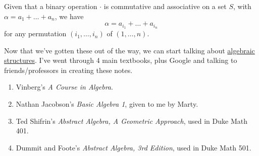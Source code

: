\begin{theorem}
  \label{thm:generalized-commutativity}
  Given that a binary operation $\cdot$ is commutative and associative on a set $S$, with $\alpha = a_1 + \ldots + a_n$, we have 
  \begin{equation}
    \alpha = a_{i_1} + \ldots + a_{i_n}
  \end{equation}
  for any permutation $(i_1, \ldots, i_n)$ of $(1, \ldots, n)$. 
\end{theorem}

Now that we've gotten these out of the way, we can start talking about \hyperref[def:algebraic-structure]{algebraic structures}. I've went through 4 main textbooks, plus Google and talking to friends/professors in creating these notes. 
\begin{enumerate}
  \item Vinberg's \textit{A Course in Algebra}. 
  \item Nathan Jacobson's \textit{Basic Algebra 1}, given to me by Marty. 
  \item Ted Shifrin's \textit{Abstract Algebra, A Geometric Approach}, used in Duke Math 401. 
  \item Dummit and Foote's \textit{Abstract Algebra, 3rd Edition}, used in Duke Math 501. 
\end{enumerate}


